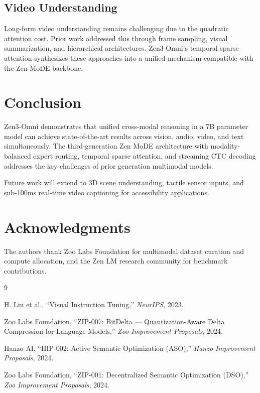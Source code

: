 \documentclass[11pt,a4paper]{article}
\begin{document}
\subsection{Video Understanding}

Long-form video understanding remains challenging due to the quadratic attention cost.
Prior work addressed this through frame sampling, visual summarization, and hierarchical
architectures. Zen3-Omni's temporal sparse attention synthesizes these approaches into
a unified mechanism compatible with the Zen MoDE backbone.

\section{Conclusion}
\label{sec:conclusion}

Zen3-Omni demonstrates that unified cross-modal reasoning in a 7B parameter model
can achieve state-of-the-art results across vision, audio, video, and text simultaneously.
The third-generation Zen MoDE architecture with modality-balanced expert routing,
temporal sparse attention, and streaming CTC decoding addresses the key challenges
of prior generation multimodal models.

Future work will extend to 3D scene understanding, tactile sensor inputs, and
sub-100ms real-time video captioning for accessibility applications.

\section*{Acknowledgments}

The authors thank Zoo Labs Foundation for multimodal dataset curation and compute
allocation, and the Zen LM research community for benchmark contributions.


\begin{thebibliography}{9}

H. Liu et al.,
``Visual Instruction Tuning,''
\textit{NeurIPS}, 2023.

Zoo Labs Foundation,
``ZIP-007: BitDelta --- Quantization-Aware Delta Compression for Language Models,''
\textit{Zoo Improvement Proposals}, 2024.

Hanzo AI,
``HIP-002: Active Semantic Optimization (ASO),''
\textit{Hanzo Improvement Proposals}, 2024.

Zoo Labs Foundation,
``ZIP-001: Decentralized Semantic Optimization (DSO),''
\textit{Zoo Improvement Proposals}, 2024.

\end{thebibliography}
\end{document}
